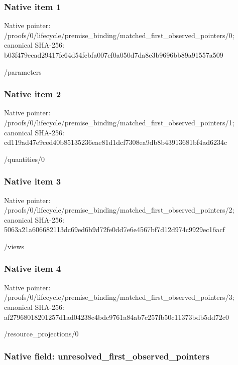 \documentclass[10pt,a4paper]{article}
\begin{document}
\subsubsection{Native item 1}


Native pointer: /proofs/0/lifecycle/prem\allowbreak{}ise\_binding/matched\_firs\allowbreak{}t\_observed\_pointers/0; canonical SHA-256: b03f479ecad29417fe64d54f\allowbreak{}ebfa007ef0a050d7da8e3b96\allowbreak{}96bb89a91557a509


/parameters


\subsubsection{Native item 2}


Native pointer: /proofs/0/lifecycle/prem\allowbreak{}ise\_binding/matched\_firs\allowbreak{}t\_observed\_pointers/1; canonical SHA-256: cd119ad47e9ced40b8513523\allowbreak{}6eae81d1dcf7308ea9db8b43\allowbreak{}913681bf4ad6234c


/quantities/0


\subsubsection{Native item 3}


Native pointer: /proofs/0/lifecycle/prem\allowbreak{}ise\_binding/matched\_firs\allowbreak{}t\_observed\_pointers/2; canonical SHA-256: 5063a21a606682113dc69ed6\allowbreak{}b9d72fe0dd7e6e4567bf7d12\allowbreak{}d974c9929ec16acf


/views


\subsubsection{Native item 4}


Native pointer: /proofs/0/lifecycle/prem\allowbreak{}ise\_binding/matched\_firs\allowbreak{}t\_observed\_pointers/3; canonical SHA-256: af27968018201257d1ad0423\allowbreak{}8c4bdc9761a84ab7c257fb50\allowbreak{}c11373bdb5dd72c0


/resource\_projections/0


\subsubsection{Native field: unresolved\_first\_observed\_pointers}
\end{document}
